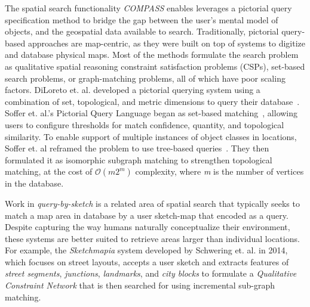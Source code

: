 \par{The spatial search functionality \emph{COMPASS} enables leverages a pictorial query specification method to bridge the gap between the user's mental model of objects, and the geospatial data available to search. 
Traditionally, pictorial query-based approaches are map-centric, as they were built on top of systems to digitize and database physical maps\cite{Samet1996,Samet1998}.
Most of the methods formulate the search problem as qualitative spatial reasoning constraint satisfaction problems (CSPs), set-based search problems, or graph-matching problems, all of which have poor scaling factors.
DiLoreto et. al. developed a pictorial querying system using a combination of set, topological, and metric dimensions to query their database~\cite{DiLoreto1996}.
Soffer et. al.'s Pictorial Query Language began as set-based matching~\cite{Soffer1997, Soffer1998a}, allowing users to configure thresholds for match confidence, quantity, and topological similarity.
To enable support of multiple instances of object classes in locations, Soffer et. al reframed the problem to use tree-based queries~\cite{Soffer1999}.
They then formulated it as isomorphic subgraph matching to strengthen topological matching, at the cost of $\mathcal{O}(m2^m)$ complexity, where \textit{m} is the number of vertices in the database. 


Work in \textit{query-by-sketch} is a related area of spatial search that typically seeks to match a map area in database by a user sketch-map that encoded as a query. 
Despite capturing the way humans naturally conceptualize their environment, these systems are better suited to retrieve areas larger than individual locations.
For example, the \textit{Sketchmapia} system developed by Schwering et. al. in 2014, which focuses on street layouts, accepts a user sketch and extracts features of \textit{street segments}, \textit{junctions}, \textit{landmarks}, and \textit{city blocks} to formulate a \textit{Qualitative Constraint Network} that is then searched for using incremental sub-graph matching.
}


